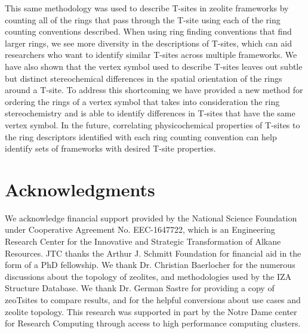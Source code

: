 \documentclass[preprint,numrefs,noinfo,sort&compress]{elsarticle}
\providecommand{\DIFaddbegin}{} %
\providecommand{\DIFaddend}{} %
\providecommand{\DIFdelbegin}{} %
\providecommand{\DIFdelend}{} %
\newcommand{\DIFscaledelfig}{0.5}
\newlength{\DIFdelgraphicswidth} %
\newlength{\DIFdelgraphicsheight} %
\newcommand{\DIFaddincludegraphics}[2][]{{\color{blue}\fbox{\DIFOincludegraphics[#1]{#2}}}} %
\newcommand{\DIFdelincludegraphics}[2][]{%
\sbox{\DIFdelgraphicsbox}{\DIFOincludegraphics[#1]{#2}}%
\settoboxwidth{\DIFdelgraphicswidth}{\DIFdelgraphicsbox} %
\settoboxtotalheight{\DIFdelgraphicsheight}{\DIFdelgraphicsbox} %
\scalebox{\DIFscaledelfig}{%
\parbox[b]{\DIFdelgraphicswidth}{\usebox{\DIFdelgraphicsbox}\\[-\baselineskip] \rule{\DIFdelgraphicswidth}{0em}}\llap{\resizebox{\DIFdelgraphicswidth}{\DIFdelgraphicsheight}{%
\setlength{\unitlength}{\DIFdelgraphicswidth}%
\begin{picture}(1,1)%
\thicklines\linethickness{2pt} %
{\color[rgb]{1,0,0}\put(0,0){\framebox(1,1){}}}%
{\color[rgb]{1,0,0}\put(0,0){\line( 1,1){1}}}%
{\color[rgb]{1,0,0}\put(0,1){\line(1,-1){1}}}%
\end{picture}%
}\hspace*{3pt}}} %
} %
\DeclareRobustCommand{\DIFaddbegin}{\DIFOaddbegin \let\includegraphics\DIFaddincludegraphics} %
\DeclareRobustCommand{\DIFaddend}{\DIFOaddend \let\includegraphics\DIFOincludegraphics} %
\DeclareRobustCommand{\DIFdelbegin}{\DIFOdelbegin \let\includegraphics\DIFdelincludegraphics} %
\DeclareRobustCommand{\DIFdelend}{\DIFOaddend \let\includegraphics\DIFOincludegraphics} %
\begin{document}
This same methodology was used to describe T-sites in zeolite frameworks by counting all of the rings that pass through the T-site using each of the ring counting conventions described. When using ring finding conventions that find larger rings, we see more diversity in the descriptions of T-sites, which can aid researchers who want to identify similar T-sites across multiple frameworks. We have also shown that the vertex symbol used to describe T-sites leaves out subtle but distinct stereochemical differences in the spatial orientation of the rings around a T-site. To address this shortcoming we have provided a new method for ordering the rings of a vertex symbol that takes into consideration the ring stereochemistry and is able to identify differences in T-sites that have the same vertex symbol. In the future, correlating physicochemical properties of T-sites to the ring descriptors identified with each ring counting convention can help identify sets of frameworks with desired T-site properties. 

\section{Acknowledgments}
\DIFdelbegin %
\DIFdelend \DIFaddbegin \label{sec:org5946b2f}
\DIFaddend 

We acknowledge financial support provided by the National Science Foundation under Cooperative Agreement No. EEC-1647722, which is an Engineering Research Center for the Innovative and Strategic Transformation of Alkane Resources. JTC thanks the Arthur J. Schmitt Foundation for financial aid in the form of a PhD fellowship. We thank Dr. Christian Baerlocher for the numerous discussions about the topology of zeolites, and methodologies used by the IZA Structure Database. We thank Dr. German Sastre for providing a copy of zeoTsites to compare results, and for the helpful conversions about use cases and zeolite topology. This research was supported in part by the Notre Dame center for Research Computing through access to high performance computing clusters. 
\backmatter



\end{document}
